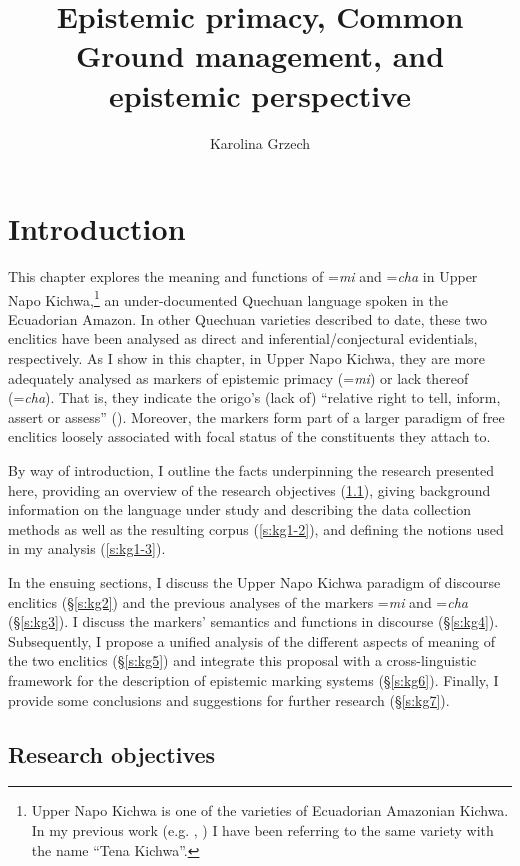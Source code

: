 \documentclass[output=paper]{langscibook}
\author{Karolina Grzech \affiliation{University of Stockholm}}
\title{Epistemic primacy, Common Ground management, and epistemic perspective}
\begin{document}
\maketitle

\largerpage
\section{Introduction}\label{s:kg1}

This chapter explores the meaning and functions of =\textit{mi} and =\textit{cha} in Upper Napo Kichwa,\footnote{Upper Napo Kichwa is one of the varieties of Ecuadorian Amazonian Kichwa. In my previous work (e.g. \citealt{Grzech2016a}, \citealt{Grzech2016b}) I have been referring to the same variety with the name “Tena Kichwa”.} an under-documented Quechuan language spoken in the Ecuadorian Amazon. In other Quechuan varieties described to date, these two enclitics have been analysed as direct and inferential/conjectural evidentials, respectively. As I show in this chapter, in Upper Napo Kichwa, they are more adequately analysed as markers of epistemic primacy (=\textit{mi}) or lack thereof (=\textit{cha}). That is, they indicate the origo’s (lack of) “relative right to tell, inform, assert or assess” (\citealt[13]{Stivers2011}). Moreover, the markers form part of a larger paradigm of free enclitics loosely associated with focal status of the constituents they attach to.

By way of introduction, I outline the facts underpinning the research presented here, providing an overview of the research objectives (‎\ref{s:kg1-1}), giving background information on the language under study and describing the data collection methods as well as the resulting corpus (‎\ref{s:kg1-2}), and defining the notions used in my analysis (‎\ref{s:kg1-3}).

In the ensuing sections, I discuss the Upper Napo Kichwa paradigm of discourse enclitics (§‎\ref{s:kg2}) and the previous analyses of the markers =\textit{mi} and =\textit{cha} (§‎\ref{s:kg3}). I discuss the markers’ semantics and functions in discourse (§‎\ref{s:kg4}). Subsequently, I propose a unified analysis of the different aspects of meaning of the two enclitics (§‎\ref{s:kg5}) and integrate this proposal with a cross-linguistic framework for the description of epistemic marking systems (§‎\ref{s:kg6}). Finally, I provide some conclusions and suggestions for further research (§‎\ref{s:kg7}).

\subsection{Research objectives}\label{s:kg1-1}
\end{document}
